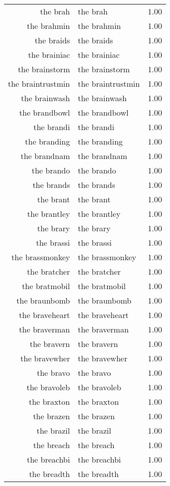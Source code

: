 \begin{table}[ht]
\begin{tabular}{rlr}
  the brah & the brah & 1.00 \\ 
  the brahmin & the brahmin & 1.00 \\ 
  the braids & the braids & 1.00 \\ 
  the brainiac & the brainiac & 1.00 \\ 
  the brainstorm & the brainstorm & 1.00 \\ 
  the braintrustmin & the braintrustmin & 1.00 \\ 
  the brainwash & the brainwash & 1.00 \\ 
  the brandbowl & the brandbowl & 1.00 \\ 
  the brandi & the brandi & 1.00 \\ 
  the branding & the branding & 1.00 \\ 
  the brandnam & the brandnam & 1.00 \\ 
  the brando & the brando & 1.00 \\ 
  the brands & the brands & 1.00 \\ 
  the brant & the brant & 1.00 \\ 
  the brantley & the brantley & 1.00 \\ 
  the brary & the brary & 1.00 \\ 
  the brassi & the brassi & 1.00 \\ 
  the brassmonkey & the brassmonkey & 1.00 \\ 
  the bratcher & the bratcher & 1.00 \\ 
  the bratmobil & the bratmobil & 1.00 \\ 
  the braunbomb & the braunbomb & 1.00 \\ 
  the braveheart & the braveheart & 1.00 \\ 
  the braverman & the braverman & 1.00 \\ 
  the bravern & the bravern & 1.00 \\ 
  the bravewher & the bravewher & 1.00 \\ 
  the bravo & the bravo & 1.00 \\ 
  the bravoleb & the bravoleb & 1.00 \\ 
  the braxton & the braxton & 1.00 \\ 
  the brazen & the brazen & 1.00 \\ 
  the brazil & the brazil & 1.00 \\ 
  the breach & the breach & 1.00 \\ 
  the breachbi & the breachbi & 1.00 \\ 
  the breadth & the breadth & 1.00 \\ 

\end{tabular}
\end{table}
